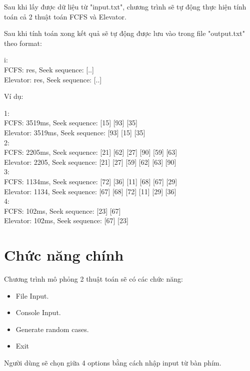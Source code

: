 \documentclass{report}
\begin{document}
            Sau khi lấy được dữ liệu từ "input.txt", chương trình sẽ tự động thực hiện tính toán cả 2 thuật toán FCFS và Elevator.

            Sau khi tính toán xong kết quả sẽ tự động được lưu vào trong file "output.txt" theo format:

            \begin{tcolorbox}[colback=red!5!white, colframe = red!50!black, title = File Output Format]
                    i:\\
                    FCFS: res, Seek sequence: [..]\\
                    Elevator: res, Seek sequence: [..]
            \end{tcolorbox}           

            Ví dụ:
            \begin{tcolorbox}[colback=gray!5!white,     colframe = gray!50!black, title = output.txt]
                    1: \\
                    FCFS: 3519ms, Seek sequence: [15] [93] [35] \\ 
                    Elevator: 3519ms, Seek sequence: [93] [15] [35] \\ 
                    2: \\
                    FCFS: 2205ms, Seek sequence: [21] [62] [27] [90] [59] [63] \\ 
                    Elevator: 2205, Seek sequence: [21] [27] [59] [62] [63] [90] \\
                    3:\\ 
                    FCFS: 1134ms, Seek sequence: [72] [36] [11] [68] [67] [29] \\ 
                    Elevator: 1134, Seek sequence: [67] [68] [72] [11] [29] [36] \\
                    4:\\ 
                    FCFS: 102ms, Seek sequence: [23] [67]\\ 
                    Elevator: 102ms, Seek sequence: [67] [23]\\ 
            \end{tcolorbox}
            
            
            
        
    \section{Chức năng chính}
        Chương trình mô phỏng 2 thuật toán sẽ có các chức năng:
            \begin{itemize}
              \item File Input.
              \item Console Input.
              \item Generate random cases.
              \item Exit
            \end{itemize}
        Người dùng sẽ chọn giữa 4 options bằng cách nhập input từ bàn phím.
        
\end{document}
